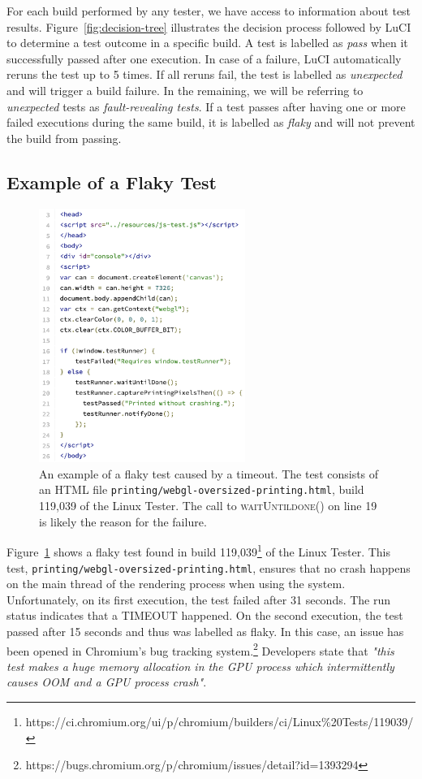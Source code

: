 For each build performed by any tester, we have access to information about test results. Figure~\ref{fig:decision-tree} illustrates the decision process followed by LuCI to determine a test outcome in a specific build. A test is labelled as \textit{pass} when it successfully passed after one execution. In case of a failure, LuCI automatically reruns the test up to 5 times. If all reruns fail, the test is labelled as \textit{unexpected} and will trigger a build failure. In the remaining, we will be referring to \textit{unexpected} tests as \textit{fault-revealing tests}. If a test passes after having one or more failed executions during the same build, it is labelled as \textit{flaky} and will not prevent the build from passing. 


\subsection{Example of a Flaky Test}

\begin{figure}[!ht]
\centering
\includegraphics[width=0.6\textwidth]{figures/chromium/flakyTestExample.png}
\caption{An example of a flaky test caused by a timeout. The test consists of an HTML file \texttt{printing/webgl-oversized-printing.html}, build 119,039 of the Linux Tester. The call to \textsc{waitUntildone()} on line 19 is likely the reason for the failure.}
\label{fig:example}
\end{figure}

Figure~\ref{fig:example} shows a flaky test found in build 119,039\footnote{https://ci.chromium.org/ui/p/chromium/builders/ci/Linux\%20Tests/119039/} of the Linux Tester. This test, \texttt{printing/webgl-oversized-printing.html}, ensures that no crash happens on the main thread of the rendering process when using the system. Unfortunately, on its first execution, the test failed after 31 seconds. The run status indicates that a \textsc{TIMEOUT} happened. On the second execution, the test passed after 15 seconds and thus was labelled as flaky. In this case, an issue has been opened in Chromium's bug tracking system.\footnote{https://bugs.chromium.org/p/chromium/issues/detail?id=1393294} Developers state that \textit{"this test makes a huge memory allocation in the GPU process which intermittently causes OOM and a GPU process crash"}.

